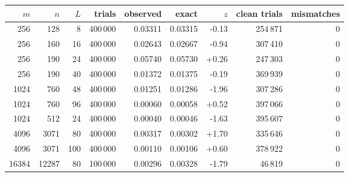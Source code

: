 \begin{tabular}{|r|r|r|r|r|r|r|r|r|}
\hline
$m$ & $n$ & $L$ & trials & observed & exact & $z$ & clean trials & mismatches \\
\hline
256 & 128 & 8 & 400\,000 & 0.03311 & 0.03315 & -0.13 & 254\,871 & 0 \\
256 & 160 & 16 & 400\,000 & 0.02643 & 0.02667 & -0.94 & 307\,410 & 0 \\
256 & 190 & 24 & 400\,000 & 0.05740 & 0.05730 & +0.26 & 247\,303 & 0 \\
256 & 190 & 40 & 400\,000 & 0.01372 & 0.01375 & -0.19 & 369\,939 & 0 \\
1024 & 760 & 48 & 400\,000 & 0.01251 & 0.01286 & -1.96 & 307\,286 & 0 \\
1024 & 760 & 96 & 400\,000 & 0.00060 & 0.00058 & +0.52 & 397\,066 & 0 \\
1024 & 512 & 24 & 400\,000 & 0.00040 & 0.00046 & -1.63 & 395\,607 & 0 \\
4096 & 3071 & 80 & 400\,000 & 0.00317 & 0.00302 & +1.70 & 335\,646 & 0 \\
4096 & 3071 & 100 & 400\,000 & 0.00110 & 0.00106 & +0.60 & 378\,922 & 0 \\
16384 & 12287 & 80 & 100\,000 & 0.00296 & 0.00328 & -1.79 & 46\,819 & 0 \\
\hline
\end{tabular}
